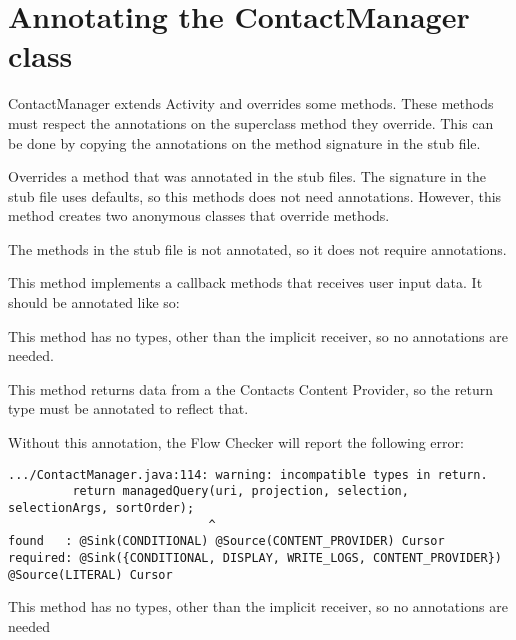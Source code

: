   
\section{Annotating the ContactManager class}

ContactManager extends Activity and overrides some methods.  These methods must
 respect the annotations on the superclass method they override.  This can be done by 
copying the annotations on the method signature in the stub file.   

     Overrides a method that was annotated in the stub files.  The signature in the
     stub file uses defaults, so this methods does not need annotations.  However,
     this method creates two anonymous classes that override methods.
     
    The methods in the stub file is not annotated, so it does not require annotations.
    
     This method implements a callback methods that receives user input data. 
     It should be annotated like so:
      
     
This method has no types, other than the implicit receiver, so no annotations are 
needed.
   
     This method returns data from a the Contacts Content Provider, so the return type must be annotated to reflect that.
         
    Without this annotation, the Flow Checker will report the following error:
\begin{Verbatim}          
.../ContactManager.java:114: warning: incompatible types in return.
         return managedQuery(uri, projection, selection, selectionArgs, sortOrder);
                            ^
found   : @Sink(CONDITIONAL) @Source(CONTENT_PROVIDER) Cursor
required: @Sink({CONDITIONAL, DISPLAY, WRITE_LOGS, CONTENT_PROVIDER}) @Source(LITERAL) Cursor
\end{Verbatim}          


 This method has no types, other than the implicit receiver, so no annotations are needed
 
